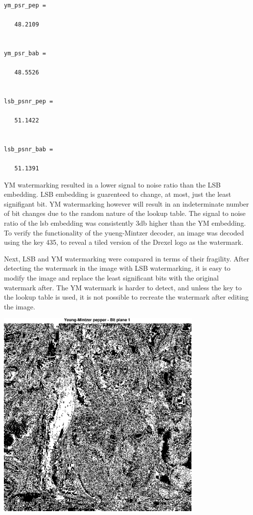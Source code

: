 \documentclass{article}
\begin{document}
        \color{lightgray} \begin{verbatim}
ym_psr_pep =

   48.2109


ym_psr_bab =

   48.5526


lsb_psnr_pep =

   51.1422


lsb_psnr_bab =

   51.1391

\end{verbatim} \color{black}

YM watermarking resulted in a lower signal to noise ratio than the
LSB embedding. LSB embedding is guarenteed to change, at most, just
the least signifigant bit. YM watermarking however will result in
an indeterminate number of bit changes due to the random nature of
the lookup table. The signal to noise ratio of the lsb embedding was
consistently 3db higher than the YM embedding.
To verify the functionality of the yueng-Mintzer decoder, an image was
decoded using the key 435, to reveal a tiled version of the Drexel
logo as the watermark.

Next, LSB and YM watermarking were compared in terms of their fragility.
After detecting the watermark in the image with LSB watermarking, it is
easy to modify the image and replace the least significant bits with the
original watermark after. The YM watermark is harder to detect, and
unless the key to the lookup table is used, it is not possible to
recreate the watermark after editing the image.
    
\includegraphics [width=4in]{lab3_05.eps}
\end{document}
